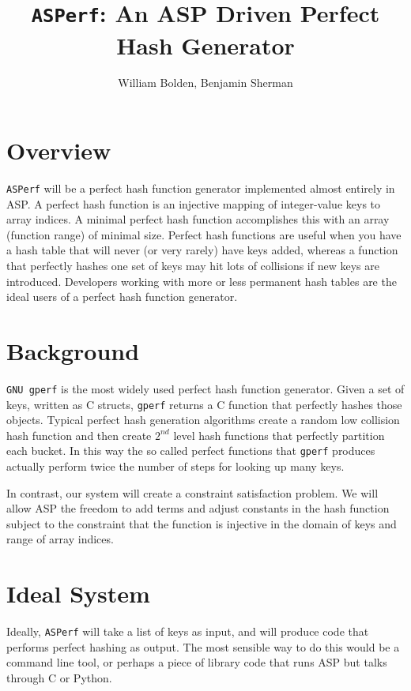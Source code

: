 \documentclass{article}
\title{\texttt{ASPerf}: An ASP Driven Perfect Hash Generator}
\author{William Bolden, Benjamin Sherman}
\begin{document}
\maketitle

\section{Overview}

\texttt{ASPerf} will be a perfect hash function generator implemented almost entirely in ASP. A perfect hash function is an injective mapping of integer-value keys to array indices. A minimal perfect hash function accomplishes this with an array (function range) of minimal size. Perfect hash functions are useful when you have a hash table that will never (or very rarely) have keys added, whereas a function that perfectly hashes one set of keys may hit lots of collisions if new keys are introduced. Developers working with more or less permanent hash tables are the ideal users of a perfect hash function generator.

\section{Background}

\texttt{GNU gperf} is the most widely used perfect hash function generator. Given a set of keys, written as C structs, \texttt{gperf} returns a C function that perfectly hashes those objects. Typical perfect hash generation algorithms create a random low collision hash function and then create $2^{nd}$ level hash functions that perfectly partition each bucket. In this way the so called perfect functions that \texttt{gperf} produces actually perform twice the number of steps for looking up many keys.

In contrast, our system will create a constraint satisfaction problem. We will allow ASP the freedom to add terms and adjust constants in the hash function subject to the constraint that the function is injective in the domain of keys and range of array indices.

\section{Ideal System}

Ideally, \texttt{ASPerf} will take a list of keys as input, and will produce code that performs perfect hashing as output. The most sensible way to do this would be a command line tool, or perhaps a piece of library code that runs ASP but talks through C or Python.
\end{document}
